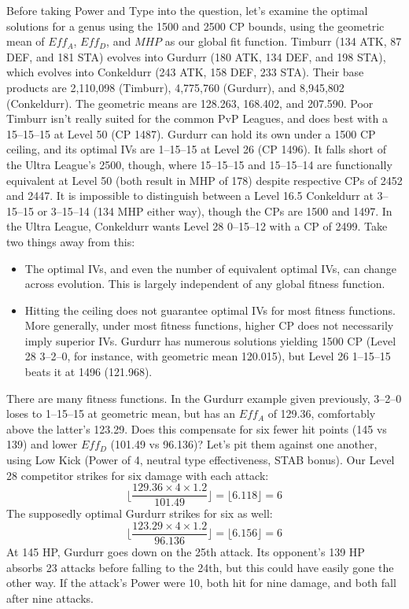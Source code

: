 Before taking Power and Type into the question, let's examine the optimal
 solutions for a genus using the 1500 and 2500 CP bounds, using the
 geometric mean of $Eff_A$, $Eff_D$, and $MHP$ as our global fit function.
Timburr (134 ATK, 87 DEF, and 181 STA) evolves into
  Gurdurr (180 ATK, 134 DEF, and 198 STA), which evolves into
  Conkeldurr (243 ATK, 158 DEF, 233 STA).
Their base products are 2,110,098 (Timburr), 4,775,760 (Gurdurr),
  and 8,945,802 (Conkeldurr).
The geometric means are 128.263, 168.402, and 207.590.
Poor Timburr isn't really suited for the common PvP Leagues,
  and does best with a 15--15--15 at Level 50 (CP 1487).
Gurdurr can hold its own under a 1500 CP ceiling, and its
  optimal IVs are 1--15--15 at Level 26 (CP 1496).
It falls short of the Ultra League's 2500, though, where
  15--15--15 and 15--15--14 are functionally equivalent
  at Level 50 (both result in MHP of 178) despite
  respective CPs of 2452 and 2447.
It is impossible to distinguish between a Level 16.5 Conkeldurr at
  3--15--15 or 3--15--14 (134 MHP either way), though
  the CPs are 1500 and 1497.
In the Ultra League, Conkeldurr wants Level 28 0--15--12 with
  a CP of 2499.
Take two things away from this:
\begin{itemize}
\item The optimal IVs, and even the number of equivalent optimal IVs, can change across evolution.
  This is largely independent of any global fitness function.
\item Hitting the ceiling does not guarantee optimal IVs for most fitness functions.
  More generally, under most fitness functions, higher CP does not necessarily imply superior IVs.
    Gurdurr has numerous solutions yielding 1500 CP (Level 28 3--2--0, for instance, with geometric
    mean 120.015), but Level 26 1--15--15 beats it at 1496 (121.968).
\end{itemize}
There are many fitness functions. In the Gurdurr example given previously, 3--2--0 loses
    to 1--15--15 at geometric mean, but has an $Eff_A$ of 129.36, comfortably above the latter's 123.29.
 Does this compensate for six fewer hit points (145 vs 139) and lower $Eff_D$ (101.49 vs 96.136)?
 Let's pit them against one another, using Low Kick (Power of 4, neutral type effectiveness, STAB bonus).
 Our Level 28 competitor strikes for six damage with each attack:
    \[ \lfloor \frac{129.36 \times 4 \times 1.2}{101.49} \rfloor = \lfloor 6.118 \rfloor = 6 \]
 The supposedly optimal Gurdurr strikes for six as well:
    \[ \lfloor \frac{123.29 \times 4 \times 1.2}{96.136} \rfloor = \lfloor 6.156 \rfloor = 6 \]
 At 145 HP, Gurdurr goes down on the 25th attack.
 Its opponent's 139 HP absorbs 23 attacks before falling to the 24th, but this could
    have easily gone the other way.
 If the attack's Power were 10, both hit for nine damage, and both fall after nine attacks.

